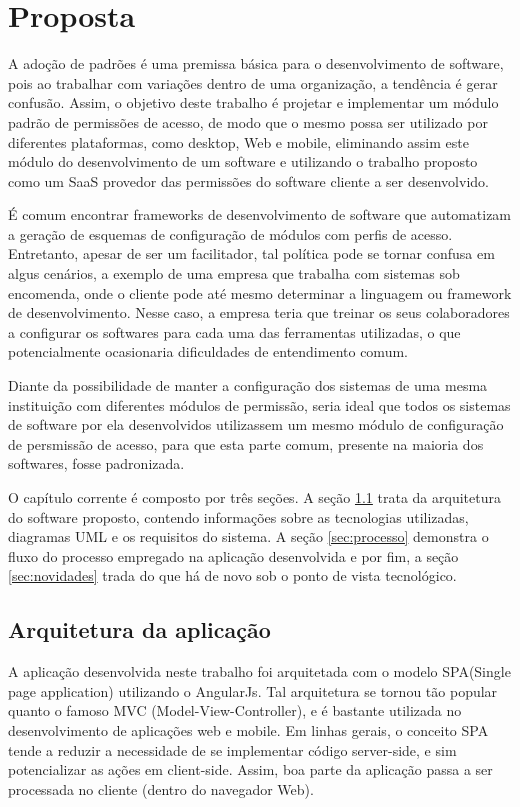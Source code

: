 \chapter{Proposta}


A adoção de padrões é uma premissa básica para o desenvolvimento de software, pois ao trabalhar com variações dentro de uma organização, a tendência é gerar confusão. Assim, o objetivo deste trabalho é projetar e implementar um módulo padrão de permissões de acesso, de modo que o mesmo possa ser utilizado por diferentes plataformas, como desktop, Web e mobile, eliminando assim este módulo do desenvolvimento de um software e utilizando o trabalho proposto como um SaaS provedor das permissões do software cliente a ser desenvolvido.


É comum encontrar frameworks de desenvolvimento de software que automatizam a geração de esquemas de configuração de módulos com perfis de acesso. Entretanto, apesar de ser um facilitador, tal política pode se tornar confusa em algus cenários, a exemplo de uma empresa que trabalha com sistemas sob encomenda, onde o cliente pode até mesmo determinar a linguagem ou framework de desenvolvimento. Nesse caso, a empresa teria que treinar os seus colaboradores a configurar os softwares para cada uma das ferramentas utilizadas, o que potencialmente ocasionaria dificuldades de entendimento comum.


Diante da possibilidade de manter a configuração dos sistemas de uma mesma instituição com diferentes módulos de permissão, seria ideal que todos os sistemas de software por ela desenvolvidos utilizassem um mesmo módulo de configuração de persmissão de acesso, para que esta parte comum, presente na maioria dos softwares, fosse padronizada.


O capítulo corrente é composto por três seções. A seção \ref{sec:arquitetura} trata da arquitetura do software proposto, contendo informações sobre as tecnologias utilizadas, diagramas UML e os requisitos do sistema. A seção \ref{sec:processo} demonstra o fluxo do processo empregado na aplicação desenvolvida e por fim, a seção \ref{sec:novidades} trada do que há de novo sob o ponto de vista tecnológico.

\section{Arquitetura da aplicação}\label{sec:arquitetura}


A aplicação desenvolvida neste trabalho foi arquitetada com o modelo SPA(Single page application) utilizando o AngularJs. Tal arquitetura se tornou tão popular quanto o famoso MVC (Model-View-Controller), e é bastante utilizada no desenvolvimento de aplicações web e mobile. Em linhas gerais, o conceito SPA tende a reduzir a necessidade de se implementar código server-side, e sim potencializar as ações em client-side. Assim, boa parte da aplicação passa a ser processada no cliente (dentro do navegador Web).


